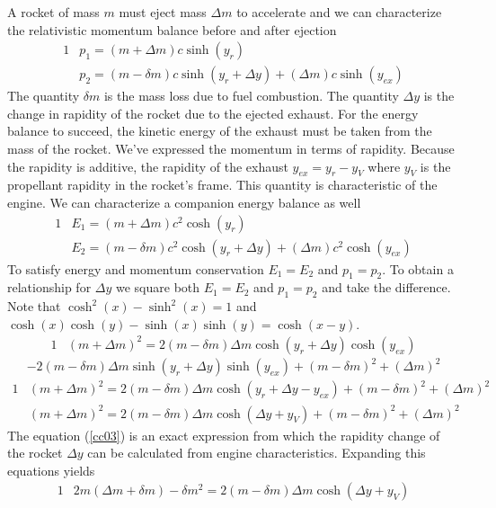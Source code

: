 \documentclass[]{article}
\numberwithin{equation}{subsection}
\begin{document}
\noindent A rocket of mass $m$ must eject mass $\Delta m$ to accelerate and we can characterize the relativistic momentum balance before and after ejection
\begin{alignat}{1}
	\label{c13}	&p_{1}=(m+\Delta m)c\sinh(y_{r})\\
	\label{c14}	&p_{2}=(m-\delta m)c\sinh(y_{r}+\Delta y)+(\Delta m)c\sinh(y_{ex})
\end{alignat}
The quantity $\delta m$ is the mass loss due to fuel combustion. The quantity $\Delta y$ is the change in rapidity of the rocket due to the ejected exhaust. For the energy balance to succeed, the kinetic energy of the exhaust must be taken from the mass of the rocket. We've expressed the momentum in terms of rapidity. Because the rapidity is additive, the rapidity of the exhaust $y_{ex}=y_{r}-y_{V}$ where $y_{V}$ is the propellant rapidity in the rocket's frame. This quantity is characteristic of the engine. We can characterize a companion energy balance as well
\begin{alignat}{1}
	\label{c15}	&E_{1}=(m+\Delta m)c^{2}\cosh(y_{r})\\
	\label{c16}	&E_{2}=(m-\delta m)c^{2}\cosh(y_{r}+\Delta y)+(\Delta m)c^{2}\cosh(y_{ex})
\end{alignat}
To satisfy energy and momentum conservation $E_{1}=E_{2}$ and $p_{1}=p_{2}$. To obtain a relationship for $\Delta y$ we square both $E_{1}=E_{2}$ and $p_{1}=p_{2}$ and take the difference. Note that $\cosh^{2}(x)-\sinh^{2}(x)=1$ and $\cosh(x)\cosh(y)-\sinh(x)\sinh(y)=\cosh(x-y)$.
\begin{alignat}{1}
	\label{cc01}	&(m+\Delta m)^{2}=2(m-\delta m)\Delta m\cosh(y_{r}+\Delta y)\cosh(y_{ex})
\end{alignat}
$$
	-2(m-\delta m)\Delta m\sinh(y_{r}+\Delta y)\sinh(y_{ex})+(m-\delta m)^{2}+(\Delta m)^{2}
$$
\begin{alignat}{1}
	\label{cc02}	&(m+\Delta m)^{2}=2(m-\delta m)\Delta m\cosh(y_{r}+\Delta y-y_{ex})+(m-\delta m)^{2}+(\Delta m)^{2}\\
	\label{cc03}	&(m+\Delta m)^{2}=2(m-\delta m)\Delta m\cosh(\Delta y+y_{V})+(m-\delta m)^{2}+(\Delta m)^{2}
\end{alignat}
The equation (\ref{cc03}) is an exact expression from which the rapidity change of the rocket $\Delta y$ can be calculated from engine characteristics. Expanding this equations yields
\begin{alignat}{1}
	\label{cc04}	&2m(\Delta m+\delta m)-\delta m^{2}=2(m-\delta m)\Delta m\cosh(\Delta y+y_{V})
\end{alignat}
\end{document}
